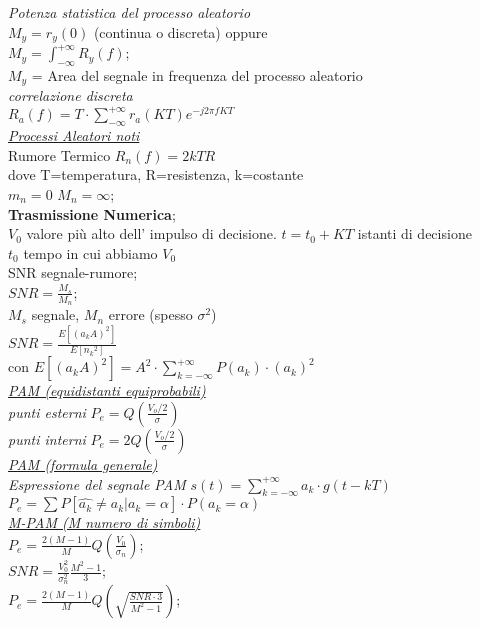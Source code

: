\documentclass[a4paper]{article}
\begin{document}
\begin{multicols*}{2}
\textit{Potenza statistica del processo aleatorio} \\
$M_y = r_y(0)$ (continua o discreta) oppure \\
$M_y = \int_{-\infty}^{+\infty} R_y(f)$;\\
$M_y$ = Area del segnale in frequenza del processo aleatorio \\
\textit{correlazione discreta} \\
$R_a(f)=T\cdot\sum_{-\infty}^{+\infty}r_a(KT)e^{-j2\pi fKT}$ \\
\underline{\textit{Processi Aleatori noti}} \\
Rumore Termico $R_n(f)=2kTR$ \\
dove T=temperatura, R=resistenza, k=costante\\
$m_n=0$ $M_n=\infty$; \\
\textbf{Trasmissione Numerica}; \\
$V_0$ valore più alto dell' impulso di decisione. 
$t=t_0 + KT$ istanti di decisione\\
$t_0$ tempo in cui abbiamo $V_0$ \\
SNR segnale-rumore; \\
$SNR=\frac{M_s}{M_n}$; \\ $M_s$ segnale, $M_n$ errore (spesso $\sigma^2$) \\ 
$SNR=\frac{E[{(a_k A)}^{2}]}{E[{n_k}^{2}]}$ \\
con $E[{(a_k A)}^{2}] = {A}^{2}\cdot \sum_{k=-\infty}^{+\infty}{P(a_k)\cdot {(a_k)}^{2}}$\\
\underline{\textit{PAM (equidistanti equiprobabili)}} \\
\textit{punti esterni}
$P_e = Q(\frac{V_o / 2}{\sigma}) $ \\
\textit{punti interni }
$P_e = 2Q(\frac{V_o / 2}{\sigma}) $ \\
\underline{\textit{PAM (formula generale)}} \\
\textit{Espressione del segnale PAM}
$s(t)=\sum_{k=-\infty}^{+\infty}a_k\cdot g(t-kT)$\\
$P_e=\sum{P[\widehat{a_k} \ne a_k | a_k=\alpha]\cdot P(a_k=\alpha)}$ \\
\underline{\textit{M-PAM (M numero di simboli) }} \\
$P_e = \frac{2(M-1)}{M}Q(\frac{V_0}{\sigma_n})$;\\
$SNR = \frac{V_0^2}{\sigma_n^2}\frac{M^2-1}{3}$; \\
$P_e = \frac{2(M-1)}{M}Q(\sqrt{\frac{SNR \cdot 3}{M^2-1}})$; \\

\end{multicols*}
\end{document}
